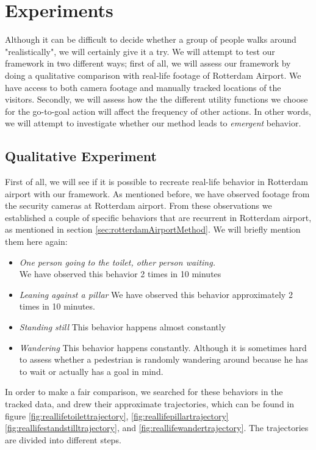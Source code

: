 \documentclass[11pt, a4paper]{book}
\begin{document}
\chapter{Experiments}
\label{chap:experiments}
Although it can be difficult to decide whether a group of people walks around "realistically", we will certainly give it a try. We will attempt to test our framework in two different ways; first of all, we will assess our framework by doing a qualitative comparison with real-life footage of Rotterdam Airport. We have access to both camera footage and manually tracked locations of the visitors.
Secondly, we will assess how the the different utility functions we choose for the go-to-goal action will affect the frequency of other actions. In other words, we will attempt to investigate whether our method leads to \emph{emergent} behavior.

\section{Qualitative Experiment}
First of all, we will see if it is possible to recreate real-life behavior in Rotterdam airport with our framework. As mentioned before, we have observed footage from the security cameras at Rotterdam airport. From these observations we established a couple of specific behaviors that are recurrent in Rotterdam airport, as mentioned in section \ref{sec:rotterdamAirportMethod}. We will briefly mention them here again:
\begin{itemize}
\item \emph{One person going to the toilet, other person waiting.}\\
We have observed this behavior 2 times in 10 minutes
\item \emph{Leaning against a pillar}
We have observed this behavior approximately 2 times in 10 minutes.
\item \emph{Standing still}
This behavior happens almost constantly
\item \emph{Wandering}
This behavior happens constantly. Although it is sometimes hard to assess whether a pedestrian is randomly wandering around because he has to wait or actually has a goal in mind.
\end{itemize}

In order to make a fair comparison, we searched for these behaviors in the tracked data, and drew their approximate trajectories, which can be found in figure \ref{fig:reallifetoilettrajectory}, \ref{fig:reallifepillartrajectory} \ref{fig:reallifestandstilltrajectory}, and \ref{fig:reallifewandertrajectory}. The trajectories are divided into different steps.
\end{document}
